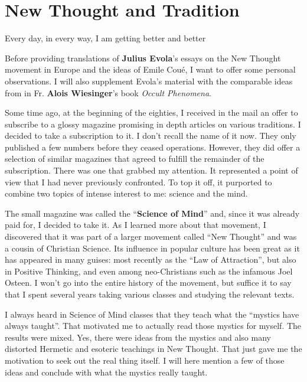 \section{New Thought and Tradition}

\begin{quotex}
Every day, in every way, I am getting better and better
\end{quotex}


Before providing translations of \textbf{Julius Evola}'s essays on the New Thought movement in Europe and the ideas of Emile Coué, I want to offer some personal observations. I will also supplement Evola's material with the comparable ideas from in Fr. \textbf{Alois Wiesinger}'s book \emph{Occult Phenomena}.

Some time ago, at the beginning of the eighties, I received in the mail an offer to subscribe to a glossy magazine promising in depth articles on various traditions. I decided to take a subscription to it. I don't recall the name of it now. They only published a few numbers before they ceased operations. However, they did offer a selection of similar magazines that agreed to fulfill the remainder of the subscription. There was one that grabbed my attention. It represented a point of view that I had never previously confronted. To top it off, it purported to combine two topics of intense interest to me: science and the mind.

The small magazine was called the ``\textbf{Science of Mind}'' and, since it was already paid for, I decided to take it. As I learned more about that movement, I discovered that it was part of a larger movement called ``New Thought'' and was a cousin of Christian Science. Its influence in popular culture has been great as it has appeared in many guises: most recently as the ``Law of Attraction'', but also in Positive Thinking, and even among neo-Christians such as the infamous Joel Osteen. I won't go into the entire history of the movement, but suffice it to say that I spent several years taking various classes and studying the relevant texts.

I always heard in Science of Mind classes that they teach what the ``mystics have always taught''. That motivated me to actually read those mystics for myself. The results were mixed. Yes, there were ideas from the mystics and also many distorted Hermetic and esoteric teachings in New Thought. That just gave me the motivation to seek out the real thing itself. I will here mention a few of those ideas and conclude with what the mystics really taught.

